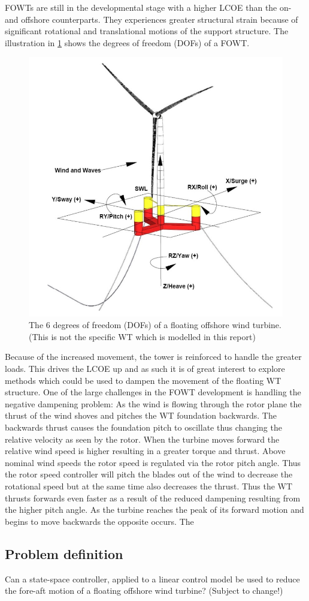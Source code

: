 FOWTs are still in the developmental stage with a higher LCOE than the on- and offshore counterparts. They experiences greater structural strain because of significant rotational and translational motions of the support structure. The illustration in \cref{fig:fowt_coordinates} shows the degrees of freedom (DOFs) of a FOWT. 
\begin{figure}[h]
	\centering
	\includegraphics[width=0.55\linewidth]{Graphics/FOWTcoordinates.png}
	\caption{The 6 degrees of freedom (DOFs) of a floating offshore wind turbine. (This is not the specific WT which is modelled in this report) \cite{Vanelli2021}}
	\label{fig:fowt_coordinates}
\end{figure}
Because of the increased movement, the tower is reinforced to handle the greater loads. This drives the LCOE up and as such it is of great interest to explore methods which could be used to dampen the movement of the floating WT structure. One of the large challenges in the FOWT development is handling the negative dampening problem: As the wind is flowing through the rotor plane the thrust of the wind shoves and pitches the WT foundation backwards. The backwards thrust causes the foundation pitch to oscillate thus changing the relative velocity as seen by the rotor. When the turbine moves forward the relative wind speed is higher resulting in a greater torque and thrust. Above nominal wind speeds the rotor speed is regulated via the rotor pitch angle. Thus the rotor speed controller will pitch the blades out of the wind to decrease the rotational speed but at the same time also decreases the thrust. Thus the WT thrusts forwards even faster as a result of the reduced dampening resulting from the higher pitch angle. As the turbine reaches the peak of its forward motion and begins to move backwards the opposite occurs. The 



\subsection{Problem definition}
Can a state-space controller, applied to a linear control model be used to reduce the fore-aft motion of a floating offshore wind turbine? (Subject to change!)


